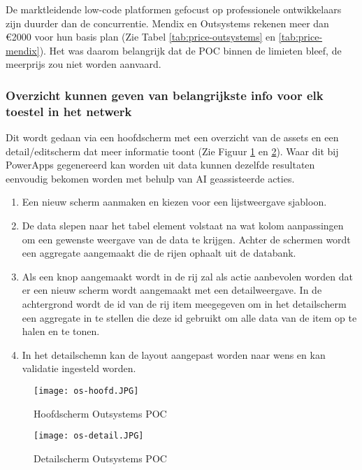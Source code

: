 De marktleidende low-code platformen gefocust op professionele ontwikkelaars zijn duurder dan de concurrentie. Mendix en Outsystems rekenen meer dan \euro2000 voor hun basis plan (Zie Tabel \ref{tab:price-outsystems} en \ref{tab:price-mendix}). Het was daarom belangrijk dat de POC binnen de limieten bleef, de meerprijs zou niet worden aanvaard.

\subsubsection{Overzicht kunnen geven van belangrijkste info voor elk toestel in het netwerk}

Dit wordt gedaan via een hoofdscherm met een overzicht van de assets en een detail/editscherm dat meer informatie toont (Zie Figuur \ref{fig:os-hoofd} en \ref{fig:os-detail}).
Waar dit bij PowerApps gegenereerd kan worden uit data kunnen dezelfde resultaten eenvoudig bekomen worden met behulp van AI geassisteerde acties.
\begin{enumerate}
    \item Een nieuw scherm aanmaken en kiezen voor een lijstweergave sjabloon.
    \item De data slepen naar het tabel element volstaat na wat kolom aanpassingen om een gewenste weergave van de data te krijgen. Achter de schermen wordt een aggregate aangemaakt die de rijen ophaalt uit de databank.
    \item Als een knop aangemaakt wordt in de rij zal als actie aanbevolen worden dat er een nieuw scherm wordt aangemaakt met een detailweergave. In de achtergrond wordt de id van de rij item meegegeven om in het detailscherm een aggregate in te stellen die deze id gebruikt om alle data van de item op te halen en te tonen.
    \item In het detailschemn kan de layout aangepast worden naar wens en kan validatie ingesteld worden.
\end{enumerate}

\begin{figure}[h!]
    \texttt{[image: os-hoofd.JPG]}
    \caption{Hoofdscherm Outsystems POC}
    \label{fig:os-hoofd}
\end{figure}

\begin{figure}[h!]
    \texttt{[image: os-detail.JPG]}
    \caption{Detailscherm Outsystems POC}
    \label{fig:os-detail}
\end{figure}

